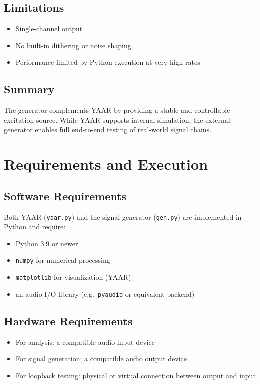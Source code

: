\documentclass[conference]{IEEEtran}
\begin{document}
\subsection{Limitations}
\begin{itemize}[leftmargin=*,nosep]
    \item Single-channel output
    \item No built-in dithering or noise shaping
    \item Performance limited by Python execution at very high rates
\end{itemize}

\subsection{Summary}
The generator complements YAAR by providing a stable and controllable excitation source. While YAAR supports internal simulation, the external generator enables full end-to-end testing of real-world signal chains.

\section{Requirements and Execution}

\subsection{Software Requirements}
Both YAAR (\texttt{yaar.py}) and the signal generator (\texttt{gen.py}) are implemented in Python and require:

\begin{itemize}[leftmargin=*,nosep]
    \item Python 3.9 or newer
    \item \texttt{numpy} for numerical processing
    \item \texttt{matplotlib} for visualization (YAAR)
    \item an audio I/O library (e.g.\ \texttt{pyaudio} or equivalent backend)
\end{itemize}

\subsection{Hardware Requirements}
\begin{itemize}[leftmargin=*,nosep]
    \item For analysis: a compatible audio input device
    \item For signal generation: a compatible audio output device
    \item For loopback testing: physical or virtual connection between output and input
\end{itemize}
\end{document}
